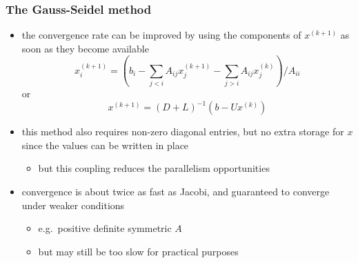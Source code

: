 \begin{frame}[fragile]
%
  \frametitle{The Gauss-Seidel method}
%
  \begin{itemize}
%
  \item the convergence rate can be improved by using the components of $x^{(k+1)}$ as soon as
    they become available
    \begin{equation}
      x_{i}^{(k+1)} =
      \left(
        b_{i} - \sum_{j < i} A_{ij}x_{j}^{(k+1)} - \sum_{j > i} A_{ij}x_{j}^{(k)}
      \right) / A_{ii}
    \end{equation}
    or
    \begin{equation}
      x^{(k+1)} = (D+L)^{-1} \left( b - Ux^{(k)} \right)
    \end{equation}
%
  \item this  method also requires non-zero diagonal entries, but no extra storage for $x$
    since the values can be written in place
    \begin{itemize}
    \item but this coupling reduces the parallelism opportunities
    \end{itemize}
%
  \item convergence is about twice as fast as Jacobi, and guaranteed to converge under weaker
    conditions
    \begin{itemize}
    \item e.g.~positive definite symmetric $A$
    \item but may still be too slow for practical purposes
    \end{itemize}
% 
  \end{itemize}
%
\end{frame}

